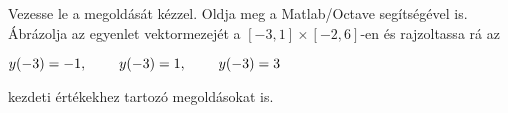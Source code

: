 Vezesse le a 
\de{} megoldását kézzel. 
Oldja meg a Matlab/Octave   segítségével is. 
Ábrázolja az egyenlet vektormezejét a $[-3,1]\times [-2,6]$-en és rajzoltassa rá 
az 
\centerline{$y(-3)=-1, \hspace{0.8cm} y(-3)=1, \hspace{0.8cm} y(-3)=3$} 
kezdeti értékekhez tartozó megoldásokat is.


